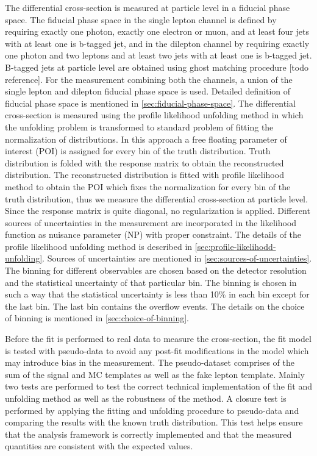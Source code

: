The differential cross-section is measured at particle level in a fiducial phase space. The fiducial phase space in the single lepton channel is defined by requiring exactly one photon, exactly one electron or muon, and at least four jets with at least one is b-tagged jet, and in the dilepton channel by requiring exactly one photon and two leptons and at least two jets with at least one is b-tagged jet. B-tagged jets at particle level are obtained using ghost matching procedure [todo reference]. For the measurement combining both the channels, a union of the single lepton and dilepton fiducial phase space is used. Detailed definition of fiducial phase space is mentioned in \cref{sec:fiducial-phase-space}. The differential cross-section is measured using the profile likelihood unfolding method in which the unfolding problem is transformed to standard problem of fitting the normalization of distributions. In this approach a free floating parameter of interest (POI) is assigned for every bin of the truth distribution. Truth distribution is folded with the response matrix to obtain the reconstructed distribution. The reconstructed distribution is fitted with profile likelihood method to obtain the POI which fixes the normalization for every bin of the truth distribution, thus we measure the differential cross-section at particle level. Since the response matrix is quite diagonal, no regularization is applied. Different sources of uncertainties in the measurement are incorporated in the likelihood function as nuisance parameter (NP) with proper constraint. The details of the profile likelihood unfolding method is described in \cref{sec:profile-likelihodd-unfolding}. Sources of uncertainties are mentioned in \cref{sec:sources-of-uncertainties}. The binning for different observables are chosen based on the detector resolution and the statistical uncertainty of that particular bin. The binning is chosen in such a way that the statistical uncertainty is less than 10\% in each bin except for the last bin. The last bin contains the overflow events. The details on the choice of binning is mentioned in \cref{sec:choice-of-binning}.

Before the fit is performed to real data to measure the cross-section, the fit model is tested with pseudo-data to avoid any post-fit modifications in the model which may introduce bias in the measurement. The pseudo-dataset comprises of the sum of the signal and MC templates as well as the fake lepton template. Mainly two tests are performed to test the correct technical implementation of the fit and unfolding method as well as the robustness of the method. A closure test is performed by applying the fitting and unfolding procedure to pseudo-data and comparing the results with the known truth distribution. This test helps ensure that the analysis framework is correctly implemented and that the measured quantities are consistent with the expected values.

